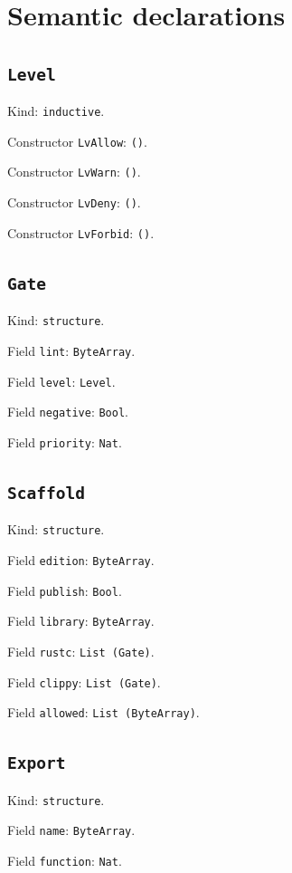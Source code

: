 \documentclass[11pt]{article}
\begin{document}
\section*{Semantic declarations}
\subsection*{\texttt{Level}}
\noindent Kind: \texttt{inductive}.\par
\noindent Constructor \texttt{LvAllow}: \texttt{()}.\par
\noindent Constructor \texttt{LvWarn}: \texttt{()}.\par
\noindent Constructor \texttt{LvDeny}: \texttt{()}.\par
\noindent Constructor \texttt{LvForbid}: \texttt{()}.\par
\subsection*{\texttt{Gate}}
\noindent Kind: \texttt{structure}.\par
\noindent Field \texttt{lint}: \texttt{ByteArray}.\par
\noindent Field \texttt{level}: \texttt{Level}.\par
\noindent Field \texttt{negative}: \texttt{Bool}.\par
\noindent Field \texttt{priority}: \texttt{Nat}.\par
\subsection*{\texttt{Scaffold}}
\noindent Kind: \texttt{structure}.\par
\noindent Field \texttt{edition}: \texttt{ByteArray}.\par
\noindent Field \texttt{publish}: \texttt{Bool}.\par
\noindent Field \texttt{library}: \texttt{ByteArray}.\par
\noindent Field \texttt{rustc}: \texttt{List (Gate)}.\par
\noindent Field \texttt{clippy}: \texttt{List (Gate)}.\par
\noindent Field \texttt{allowed}: \texttt{List (ByteArray)}.\par
\subsection*{\texttt{Export}}
\noindent Kind: \texttt{structure}.\par
\noindent Field \texttt{name}: \texttt{ByteArray}.\par
\noindent Field \texttt{function}: \texttt{Nat}.\par
\end{document}
